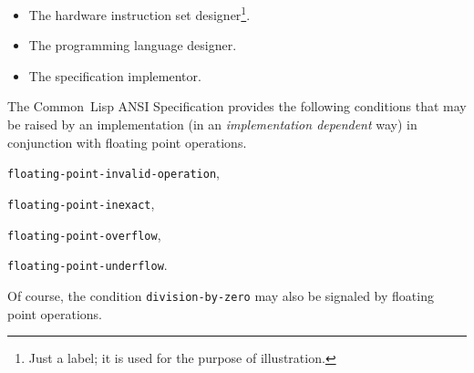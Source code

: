 \documentclass[10pt,fleqn]{article}
\newcommand{\CL}{\textsf{Common~Lisp}}
\newcommand{\code}[1]{\texttt{#1}}
\begin{document}
\begin{itemize}
\item The hardware instruction set designer\footnote{Just a label; it
    is used for the purpose of illustration.}.
\item The programming language designer.
\item The specification implementor.
\end{itemize}

The \CL{} ANSI Specification provides the following conditions that
may be raised by an implementation (in an \emph{implementation
  dependent} way) in conjunction with floating point operations.
\begin{description}
\item \code{floating-point-invalid-operation},
\item \code{floating-point-inexact},
\item \code{floating-point-overflow},
\item \code{floating-point-underflow}.
\end{description}
Of course, the condition \code{division-by-zero} may also be signaled
by floating point operations.
\end{document}
